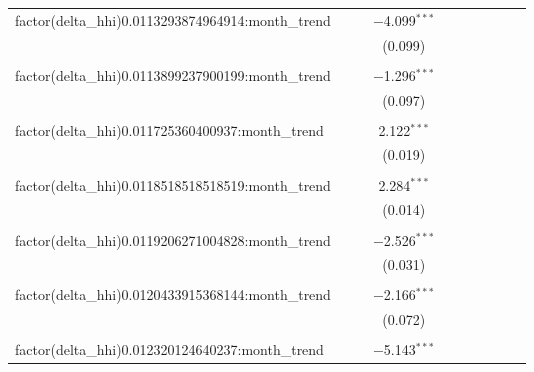 \begin{table}[H]
{\begin{tabular}{@{\extracolsep{5pt}}lccccccccc}
  factor(delta\_hhi)0.0113293874964914:month\_trend &  &  & $-$4.099$^{***}$ &  &  &  &  &  &  \\  

   &  &  & (0.099) &  &  &  &  &  &  \\  

   & & & & & & & & & \\  

  factor(delta\_hhi)0.0113899237900199:month\_trend &  &  & $-$1.296$^{***}$ &  &  &  &  &  &  \\  

   &  &  & (0.097) &  &  &  &  &  &  \\  

   & & & & & & & & & \\  

  factor(delta\_hhi)0.011725360400937:month\_trend &  &  & 2.122$^{***}$ &  &  &  &  &  &  \\  

   &  &  & (0.019) &  &  &  &  &  &  \\  

   & & & & & & & & & \\  

  factor(delta\_hhi)0.0118518518518519:month\_trend &  &  & 2.284$^{***}$ &  &  &  &  &  &  \\  

   &  &  & (0.014) &  &  &  &  &  &  \\  

   & & & & & & & & & \\  

  factor(delta\_hhi)0.0119206271004828:month\_trend &  &  & $-$2.526$^{***}$ &  &  &  &  &  &  \\  

   &  &  & (0.031) &  &  &  &  &  &  \\  

   & & & & & & & & & \\  

  factor(delta\_hhi)0.0120433915368144:month\_trend &  &  & $-$2.166$^{***}$ &  &  &  &  &  &  \\  

   &  &  & (0.072) &  &  &  &  &  &  \\  

   & & & & & & & & & \\  

  factor(delta\_hhi)0.012320124640237:month\_trend &  &  & $-$5.143$^{***}$ &  &  &  &  &  &  \\  


\end{tabular}}
\end{table}
